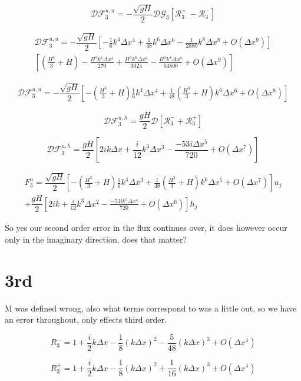 \documentclass[12pt]{article}
\begin{document}
\[\mathcal{D}\mathcal{F}_3^{u,u} = - \dfrac{ \sqrt{gH}}{ 2} \mathcal{D}\mathcal{G}_3 \left [ \mathcal{R}_3^+ \ -  \mathcal{R}_3^-  \right]\]

\begin{multline}
\mathcal{D}\mathcal{F}_3^{u,u} = - \dfrac{ \sqrt{gH}}{ 2} \left [-\frac{1}{6} k^4 \Delta x^4 + \frac{1}{48}k^6 \Delta x^6 - \frac{1}{2880}k^8 \Delta x^8 + O(\Delta x ^9)  \right] \\ 
\left[(\frac{H^3}{3} + H) - \frac{H^3 k^4 \Delta x^4}{270} + \frac{H^3 k^6 \Delta x^6}{3024} - \frac{H^3 k^8 \Delta x^8}{64800} + O(\Delta x ^9)\right]
\end{multline}

\begin{multline}
\mathcal{D}\mathcal{F}_3^{u,u} = - \dfrac{ \sqrt{gH}}{ 2} \left [-(\frac{H^3}{3} + H)\frac{1}{6} k^4 \Delta x^4 + \frac{1}{48}(\frac{H^3}{3} + H)k^6 \Delta x^6  + O(\Delta x ^8)\right]
\end{multline}


\[\mathcal{D}\mathcal{F}_3^{u,h} = \dfrac{ gH}{ 2}\mathcal{D} [\mathcal{R}_3^- + \mathcal{R}_3^+] \]

\[\mathcal{D}\mathcal{F}_3^{u,h} = \dfrac{ gH}{ 2} \left[2i k \Delta x + \frac{i}{12} k^3 \Delta x^3 - \frac{-53 i \Delta x ^5}{720} + O(\Delta x ^7)\right] \]

\begin{multline}
F^u_3 =  \dfrac{ \sqrt{gH}}{ 2} \left [-(\frac{H^3}{3} + H)\frac{1}{6} k^4 \Delta x^3 + \frac{1}{48}(\frac{H^3}{3} + H)k^6 \Delta x^5  + O(\Delta x ^7)\right]u_j\\ +\dfrac{ gH}{ 2}\left[2i k + \frac{i}{12} k^3 \Delta x^2 - \frac{-53 i k^5 \Delta x ^4}{720} + O(\Delta x ^6)\right]h_j
\end{multline}

So yes our second order error in the flux continues over, it does however occur only in the imaginary direction, does that matter?


\section{3rd}
M was defined wrong, also what terms correspond to was a little out, so we have an error throughout, only effects third order. 

\[R_3^-= 1 + \frac{i}{2}k\Delta x - \frac{1}{8} (k \Delta x)^2 - \frac{5}{48} (k \Delta x)^3 +  O( \Delta x^4) \]

\[R_3^+= 1 + \frac{i}{2}k\Delta x - \frac{1}{8} (k \Delta x)^2 + \frac{1}{16} (k \Delta x)^3 +  O( \Delta x^4)\] 
\end{document}
